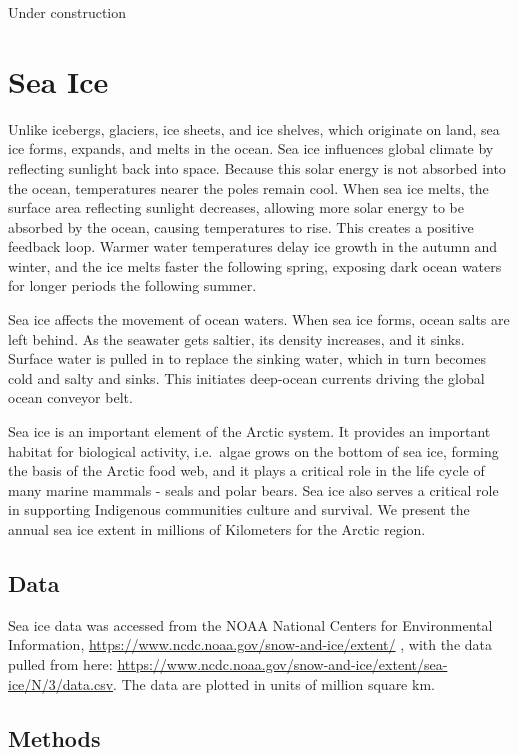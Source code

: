 \documentclass[
]{book}
\begin{document}
Under construction

\hypertarget{sea-ice}{%
\chapter{Sea Ice}\label{sea-ice}}

Unlike icebergs, glaciers, ice sheets, and ice shelves, which originate on land, sea ice forms, expands, and melts in the ocean. Sea ice influences global climate by reflecting sunlight back into space. Because this solar energy is not absorbed into the ocean, temperatures nearer the poles remain cool. When sea ice melts, the surface area reflecting sunlight decreases, allowing more solar energy to be absorbed by the ocean, causing temperatures to rise. This creates a positive feedback loop. Warmer water temperatures delay ice growth in the autumn and winter, and the ice melts faster the following spring, exposing dark ocean waters for longer periods the following summer.

Sea ice affects the movement of ocean waters. When sea ice forms, ocean salts are left behind. As the seawater gets saltier, its density increases, and it sinks. Surface water is pulled in to replace the sinking water, which in turn becomes cold and salty and sinks. This initiates deep-ocean currents driving the global ocean conveyor belt.

Sea ice is an important element of the Arctic system. It provides an important habitat for biological activity, i.e.~algae grows on the bottom of sea ice, forming the basis of the Arctic food web, and it plays a critical role in the life cycle of many marine mammals - seals and polar bears. Sea ice also serves a critical role in supporting Indigenous communities culture and survival. We present the annual sea ice extent in millions of Kilometers for the Arctic region.

\hypertarget{data-11}{%
\section{Data}\label{data-11}}

Sea ice data was accessed from the NOAA National Centers for Environmental Information, \url{https://www.ncdc.noaa.gov/snow-and-ice/extent/} , with the data pulled from here: \url{https://www.ncdc.noaa.gov/snow-and-ice/extent/sea-ice/N/3/data.csv}. The data are plotted in units of million square km.

\hypertarget{methods-11}{%
\section{Methods}\label{methods-11}}
\end{document}
